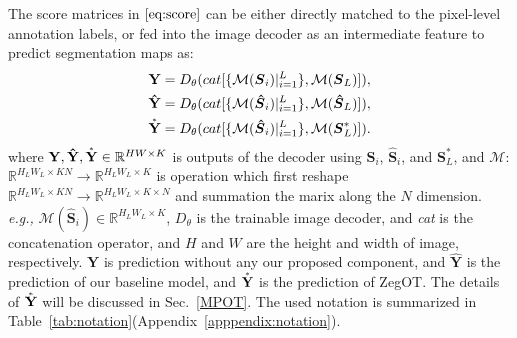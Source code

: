 \documentclass[nohyperref]{article}
\newcommand{\bs}{\boldsymbol}
\newcommand{\asty}{\accentset{\ast}{\mathbf{Y}}}
\newcommand{\mbf}{\mathbf}
\theoremstyle{plain}
\theoremstyle{definition}
\theoremstyle{remark}
\begin{document}
{The score matrices in $\eqref{eq:score}$ can be either directly matched to the pixel-level annotation labels, or %
fed into the image decoder as an intermediate feature to predict segmentation maps as:
\begin{align}
\mbf{Y} = D_{\theta}(cat[\{\mathcal{M}(\bs{S}_i)|_{i=1}^{L}\},\mathcal{M}(\bs{S}_L)]),  \label{eq:predict1} \\ 
\mbf{\hat Y} =  D_{\theta}(cat[\{\mathcal{M}(\bs{\hat S}_i)|_{i=1}^{L}\}, \mathcal{M}(\bs{\hat S}_L)]),  \label{eq:predict2}\\
\asty = D_{\theta}(cat[\{\mathcal{M}(\bs{\hat S}_i)|_{i=1}^{L}\},  \mathcal{M}(\bs{S}^{*}_L)]).
 \label{eq:predict3}
\end{align}
where $\mbf{Y, \hat Y}, \asty \in \mathbb{R}^{HW \times K}$ is outputs of the decoder using $\bs{S}_i$, $\bs{\hat S}_i$, and $\bs{S}^{\ast}_L$, and 
$\mathcal{M}$: $\mathbb{R}^{H_LW_L \times KN} \rightarrow \mathbb{R}^{H_L W_L \times K}$ is operation which first reshape $\mathbb{R}^{H_L W_L \times KN} \rightarrow \mathbb{R}^{H_L W_L \times K \times N}$ and summation the marix along the $N$ dimension. \textit{e.g.,} $\mathcal{M}(\bs{\hat S}_i) \in \mathbb{R}^{H_L W_L\times K}$, $D_{\theta}$ is the trainable image decoder, and \textit{cat} is the concatenation operator, and $H$ and $W$ are the height and width of image, respectively. 
$\mbf{Y}$ is  prediction without any our proposed component, and $\mbf{\hat Y}$ is the prediction of our baseline model, and $\asty$ is the prediction of ZegOT.
The details of $\asty$ will be discussed in Sec.~\ref{MPOT}. 
The used notation is summarized in Table~\ref{tab:notation}(Appendix~\ref{apppendix:notation}).}
    
\end{document}
